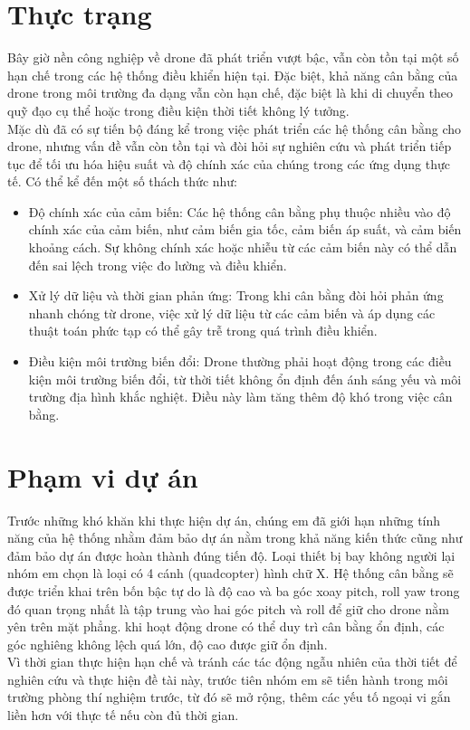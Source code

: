 \section{Thực trạng}
\tab Bây giờ nền công nghiệp về drone đã phát triển vượt bậc, vẫn còn tồn tại một số hạn chế trong các hệ thống điều khiển hiện tại. Đặc biệt, khả năng cân bằng của drone trong môi trường đa dạng vẫn còn hạn chế, đặc biệt là khi di chuyển theo quỹ đạo cụ thể hoặc trong điều kiện thời tiết không lý tưởng.\\
\tab Mặc dù đã có sự tiến bộ đáng kể trong việc phát triển các hệ thống cân bằng cho drone, nhưng vấn đề vẫn còn tồn tại và đòi hỏi sự nghiên cứu và phát triển tiếp tục để tối ưu hóa hiệu suất và độ chính xác của chúng trong các ứng dụng thực tế. Có thể kể đến một số thách thức như:
\begin{itemize} [label = --]
    \item Độ chính xác của cảm biến: Các hệ thống cân bằng phụ thuộc nhiều vào độ chính xác của cảm biến, như cảm biến gia tốc, cảm biến áp suất, và cảm biến khoảng cách. Sự không chính xác hoặc nhiễu từ các cảm biến này có thể dẫn đến sai lệch trong việc đo lường và điều khiển.
    \item Xử lý dữ liệu và thời gian phản ứng: Trong khi cân bằng đòi hỏi phản ứng nhanh chóng từ drone, việc xử lý dữ liệu từ các cảm biến và áp dụng các thuật toán phức tạp có thể gây trễ trong quá trình điều khiển.
    \item Điều kiện môi trường biến đổi: Drone thường phải hoạt động trong các điều kiện môi trường biến đổi, từ thời tiết không ổn định đến ánh sáng yếu và môi trường địa hình khắc nghiệt. Điều này làm tăng thêm độ khó trong việc cân bằng.
\end{itemize}
\section{Phạm vi dự án}
\tab Trước những khó khăn khi thực hiện dự án, chúng em đã giới hạn những tính năng của hệ thống nhằm đảm bảo dự án nằm trong khả năng kiến thức cũng như đảm bảo dự án được hoàn thành đúng tiến độ. Loại thiết bị bay không người lại nhóm em chọn là loại có 4 cánh (quadcopter) hình chữ X. Hệ thống cân bằng sẽ được triển khai trên bốn bậc tự do là độ cao và ba góc xoay pitch, roll yaw trong đó quan trọng nhất là tập trung vào hai góc pitch và roll để giữ cho drone nằm yên trên mặt phẳng. khi hoạt động drone có thể duy trì cân bằng ổn định, các góc nghiêng không lệch quá lớn, độ cao được giữ ổn định.\\
\tab Vì thời gian thực hiện hạn chế và tránh các tác động ngẫu nhiên của thời tiết để nghiên cứu và thực hiện đề tài này, trước tiên nhóm em sẽ tiến hành trong môi trường phòng thí nghiệm trước, từ đó sẽ mở rộng, thêm các yếu tố ngoại vi gắn liền hơn với thực tế nếu còn đủ thời gian.

